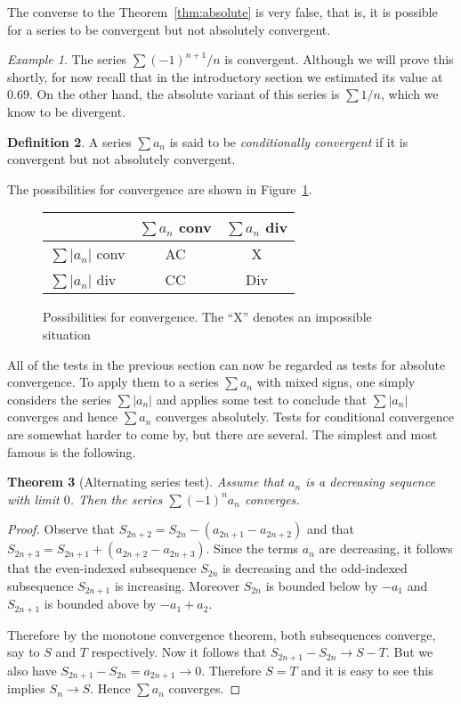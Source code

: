 \documentclass[11pt,oneside]{amsbook}
\theoremstyle{definition}
\theoremstyle{plain}
\newtheorem{thm}{Theorem}[section]
\theoremstyle{definition}
\newtheorem{defn}[thm]{Definition}
\theoremstyle{remark}
\newtheorem{example}[thm]{Example}
\numberwithin{equation}{section}
\numberwithin{figure}{section}
\begin{document}
The converse to the Theorem~\ref{thm:absolute} is very false, that is, it is possible for a series to be convergent but not absolutely convergent.

\begin{example}
  The series $\sum(-1)^{n+1}/n$ is convergent. Although we will prove this shortly, for now recall that in the introductory section we estimated its value at 0.69. On the other hand, the absolute variant of this series is $\sum 1/n$, which we know to be divergent.
\end{example}

\begin{defn}
  A series $\sum a_n$ is said to be \emph{conditionally convergent} if it is convergent but not absolutely convergent.
\end{defn}

The possibilities for convergence are shown in Figure~\ref{fig:convergence}.

\begin{figure}[h]
  \begin{tabular}{l|cc}
                     & $\sum a_n$ conv & $\sum a_n$ div\\\hline
    $\sum|a_n|$ conv & AC & X\\
    $\sum|a_n|$ div & CC & Div
  \end{tabular}
  \caption{Possibilities for convergence. The ``X'' denotes an impossible situation\label{fig:convergence}}
\end{figure}

All of the tests in the previous section can now be regarded as tests for absolute convergence. To apply them to a series $\sum a_n$ with mixed signs, one simply considers the series $\sum|a_n|$ and applies some test to conclude that $\sum|a_n|$ converges and hence $\sum a_n$ converges absolutely. Tests for conditional convergence are somewhat harder to come by, but there are several. The simplest and most famous is the following.

\begin{thm}[Alternating series test]
  Assume that $a_n$ is a decreasing sequence with limit $0$. Then the series $\sum(-1)^na_n$ converges.
\end{thm}

\begin{proof}
  Observe that $S_{2n+2}=S_{2n}-(a_{2n+1}-a_{2n+2})$ and that $S_{2n+3}=S_{2n+1}+(a_{2n+2}-a_{2n+3})$. Since the terms $a_n$ are decreasing, it follows that the even-indexed subsequence $S_{2n}$ is decreasing and the odd-indexed subsequence $S_{2n+1}$ is increasing. Moreover $S_{2n}$ is bounded below by $-a_1$ and $S_{2n+1}$ is bounded above by $-a_1+a_2$.

  Therefore by the monotone convergence theorem, both subsequences converge, say to $S$ and $T$ respectively. Now it follows that $S_{2n+1}-S_{2n}\to S-T$. But we also have $S_{2n+1}-S_{2n}=a_{2n+1}\to0$. Therefore $S=T$ and it is easy to see this implies $S_n\to S$. Hence $\sum a_n$ converges.
\end{proof}
\end{document}
